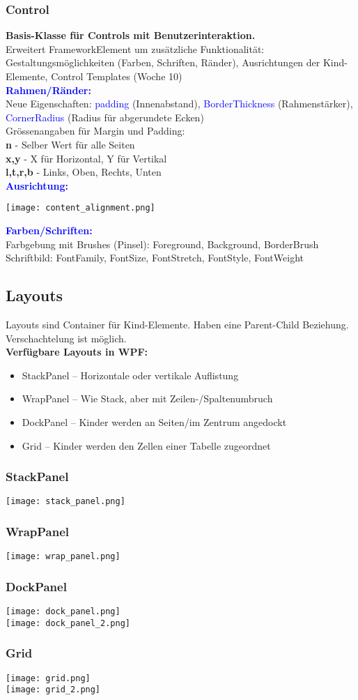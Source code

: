 \subsubsection{Control}
\textbf{Basis-Klasse für Controls mit Benutzerinteraktion.}\\
Erweitert FrameworkElement um zusätzliche Funktionalität: Gestaltungsmöglichkeiten (Farben, Schriften, Ränder), Ausrichtungen der Kind-Elemente, Control Templates (Woche 10)\\
\textbf{\textcolor{blue}{Rahmen/Ränder:}}\\
Neue Eigenschaften: \textcolor{blue}{padding} (Innenabstand), \textcolor{blue}{BorderThickness} (Rahmenstärker), \textcolor{blue}{CornerRadius} (Radius für abgerundete Ecken)\\
Grössenangaben für Margin und Padding:\\
\textbf{n} - Selber Wert für alle Seiten\\
\textbf{x,y} - X für Horizontal, Y für Vertikal\\
\textbf{l,t,r,b} - Links, Oben, Rechts, Unten\\
\textbf{\textcolor{blue}{Ausrichtung:}}
\begin{center}
    \texttt{[image: content\_alignment.png]}
\end{center}
\textbf{\textcolor{blue}{Farben/Schriften:}}\\
Farbgebung mit Brushes (\dq Pinsel\dq): Foreground, Background, BorderBrush\\
Schriftbild: FontFamily, FontSize, FontStretch, FontStyle, FontWeight

\subsection{Layouts}
Layouts sind Container für Kind-Elemente. Haben eine Parent-Child Beziehung. Verschachtelung ist möglich.\\
\textbf{Verfügbare Layouts in WPF:}
\begin{itemize}[topsep=0pt, leftmargin=4mm]
    \setlength\itemsep{-0.3em}
    \item StackPanel – Horizontale oder vertikale Auflistung
    \item WrapPanel – Wie Stack, aber mit Zeilen-/Spaltenumbruch
    \item DockPanel – Kinder werden an Seiten/im Zentrum \dq angedockt\dq
    \item Grid – Kinder werden den Zellen einer Tabelle zugeordnet
\end{itemize}
\subsubsection{StackPanel}
\texttt{[image: stack\_panel.png]}
\subsubsection{WrapPanel}
\texttt{[image: wrap\_panel.png]}
\subsubsection{DockPanel}
\texttt{[image: dock\_panel.png]}\\
\texttt{[image: dock\_panel\_2.png]}
\subsubsection{Grid}
\texttt{[image: grid.png]}\\
\texttt{[image: grid\_2.png]}